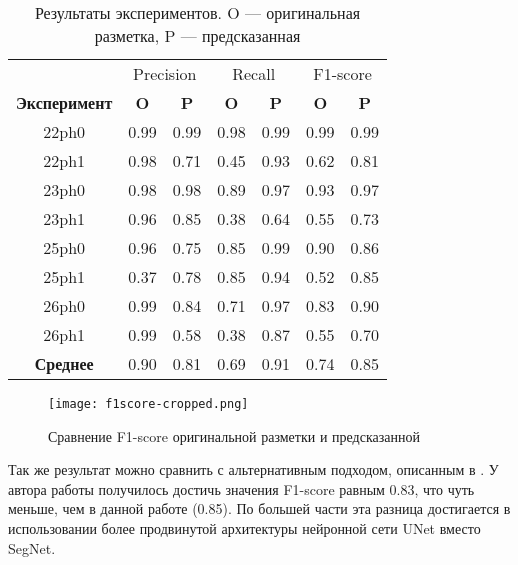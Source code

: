 \begin{table}[ht]
	\centering
	\label{tab:results}
	\begin{tabular}{ccccccc} \toprule
		                     & \multicolumn{2}{c}{Precision} & \multicolumn{2}{c}{Recall} & \multicolumn{2}{c}{F1-score}                                        \\
		\textbf{Эксперимент} & \textbf{O}                    & \textbf{P}                 & \textbf{O}                   & \textbf{P} & \textbf{O} & \textbf{P} \\ \midrule
		22ph0 & 0.99 & 0.99 & 0.98 & 0.99 & 0.99 & 0.99 \\
		22ph1 & 0.98 & 0.71 & 0.45 & 0.93 & 0.62 & 0.81 \\
		23ph0 & 0.98 & 0.98 & 0.89 & 0.97 & 0.93 & 0.97 \\
		23ph1 & 0.96 & 0.85 & 0.38 & 0.64 & 0.55 & 0.73 \\
		25ph0 & 0.96 & 0.75 & 0.85 & 0.99 & 0.90 & 0.86 \\
		25ph1 & 0.37 & 0.78 & 0.85 & 0.94 & 0.52 & 0.85 \\
		26ph0 & 0.99 & 0.84 & 0.71 & 0.97 & 0.83 & 0.90 \\
		26ph1 & 0.99 & 0.58 & 0.38 & 0.87 & 0.55 & 0.70 \\ \midrule
		\textbf{Среднее} & 0.90 & 0.81 & 0.69 & 0.91 & 0.74 & 0.85 \\
		\bottomrule
	\end{tabular}
	\caption{\centering Результаты экспериментов. O --- оригинальная разметка, P --- предсказанная}
\end{table}

\begin{figure}[!htb]
	\centering
	\texttt{[image: f1score-cropped.png]}
	\caption{Сравнение F1-score оригинальной разметки и предсказанной}
	\label{fig:f1score-vs}
\end{figure}

Так же результат можно сравнить с альтернативным подходом, описанным в
\cite{anton}. У автора работы получилось достичь значения F1-score равным 0.83,
что чуть меньше, чем в данной работе (0.85). По большей части эта разница
достигается в использовании более продвинутой архитектуры нейронной сети UNet
вместо SegNet.
